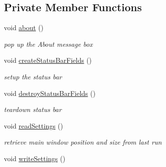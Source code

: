 \subsection*{Private Member Functions}
\begin{CompactItemize}
\item 
\hypertarget{classMainWindow_7be6a5d98970ac1a6296c6f9aee1e9bb}{
void \hyperlink{classMainWindow_7be6a5d98970ac1a6296c6f9aee1e9bb}{about} ()}
\label{classMainWindow_7be6a5d98970ac1a6296c6f9aee1e9bb}

\begin{CompactList}\small\item\em pop up the About message box \item\end{CompactList}\item 
\hypertarget{classMainWindow_25fa25750998e6db2552a01426479d1f}{
void \hyperlink{classMainWindow_25fa25750998e6db2552a01426479d1f}{createStatusBarFields} ()}
\label{classMainWindow_25fa25750998e6db2552a01426479d1f}

\begin{CompactList}\small\item\em setup the status bar \item\end{CompactList}\item 
\hypertarget{classMainWindow_945e92ccab854191c4b88df03fc40398}{
void \hyperlink{classMainWindow_945e92ccab854191c4b88df03fc40398}{destroyStatusBarFields} ()}
\label{classMainWindow_945e92ccab854191c4b88df03fc40398}

\begin{CompactList}\small\item\em teardown status bar \item\end{CompactList}\item 
\hypertarget{classMainWindow_06476208b8466211f3bb0fcae787052b}{
void \hyperlink{classMainWindow_06476208b8466211f3bb0fcae787052b}{readSettings} ()}
\label{classMainWindow_06476208b8466211f3bb0fcae787052b}

\begin{CompactList}\small\item\em retrieve main window position and size from last run \item\end{CompactList}\item 
\hypertarget{classMainWindow_49be45fc9b993fdc3afe55d4b6fa0650}{
void \hyperlink{classMainWindow_49be45fc9b993fdc3afe55d4b6fa0650}{writeSettings} ()}
\label{classMainWindow_49be45fc9b993fdc3afe55d4b6fa0650}


\end{CompactItemize}
